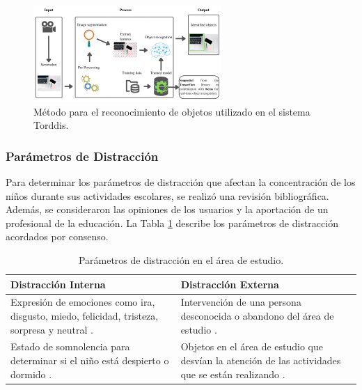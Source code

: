 \documentclass[a4paper,fleqn]{cas-sc}
\begin{document}
	\begin{figure}[hbt!]
		\centering
		\includegraphics[frame,scale=0.5, width=\linewidth]{figs/Figure_3}
		\caption{Método para el reconocimiento de objetos utilizado en el sistema Torddis.\label{fig:ObjectRecognition}}
	\end{figure} 
	
	\subsubsection{Parámetros de Distracción}
	Para determinar los parámetros de distracción que afectan la concentración de los niños durante sus actividades escolares, se realizó una revisión bibliográfica. Además, se consideraron las opiniones de los usuarios y la aportación de un profesional de la educación. La Tabla \ref{tab:DistractionParameters} describe los parámetros de distracción acordados por consenso.
	
	\begin{table}[hbt!]
		\centering
		\caption{Parámetros de distracción en el área de estudio. \label{tab:DistractionParameters}}
		\begin{tabular}{p{}p{}}
			\hline
			\multicolumn{1}{l}{\rule{0pt}{2.5ex}\textbf{Distracción Interna}} & \multicolumn{1}{l}{\rule{0pt}{2.5ex}\textbf{Distracción Externa}} \\ \hline
			Expresión de emociones como ira, disgusto, miedo, felicidad, tristeza, sorpresa y neutral \citep{Asish2022Detecting,Vettivel2018System,Pabba2022AnIntelligent}. & Intervención de una persona desconocida o abandono del área de estudio \citep{Vettivel2018System}. \\ \hline
			Estado de somnolencia para determinar si el niño está despierto o dormido \citep{Pabba2022AnIntelligent}. & Objetos en el área de estudio que desvían la atención de las actividades que se están realizando \citep{Asish2022Detecting,Pabba2022AnIntelligent}. \\ \hline
		\end{tabular}
	\end{table}
	
\end{document}
